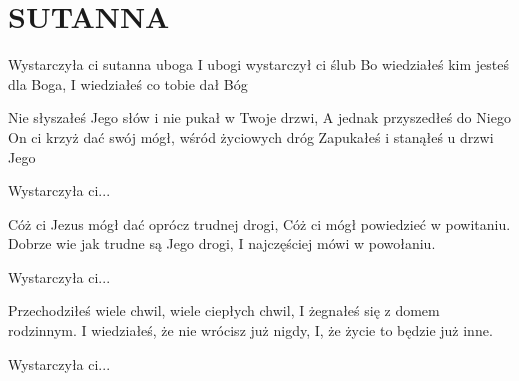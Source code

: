 \documentclass[../../../songbook.tex]{subfiles}
\begin{document}
\TabPositions{8cm} %
\section*{SUTANNA}
{}
\vspace{0.5cm}
\-\hspace{1cm} Wystarczyła ci sutanna uboga		 \newline
\-\hspace{1cm} I ubogi wystarczył ci ślub			 \newline
\-\hspace{1cm} Bo wiedziałeś kim jesteś dla Boga,	 \newline
\-\hspace{1cm} I wiedziałeś co tobie dał Bóg		 \newline	

Nie słyszałeś Jego słów i nie pukał w Twoje drzwi,		 \newline
A jednak przyszedłeś do Niego							 \newline
On ci krzyż dać swój mógł, wśród życiowych dróg		 \newline	
Zapukałeś i stanąłeś u drzwi Jego					 \newline	

\-\hspace{1cm} Wystarczyła ci... \newline

Cóż ci Jezus mógł dać oprócz trudnej drogi, \newline
Cóż ci mógł powiedzieć w powitaniu. \newline
Dobrze wie jak trudne są Jego drogi, \newline
I najczęściej mówi w powołaniu. \newline

\-\hspace{1cm} Wystarczyła ci... \newline

Przechodziłeś wiele chwil, wiele ciepłych chwil, \newline
I żegnałeś się z domem rodzinnym. \newline
I wiedziałeś, że nie wrócisz już nigdy, \newline
I, że życie to będzie już inne. \newline

\-\hspace{1cm} Wystarczyła ci... \newline
\end{document}
